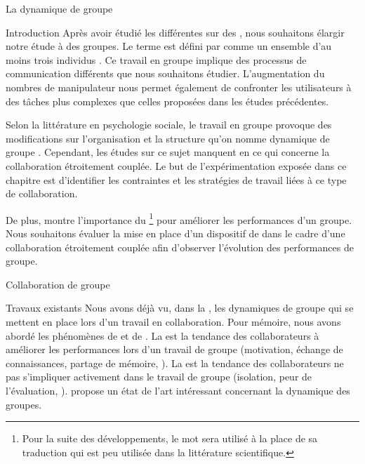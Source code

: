\documentclass[myfrancais,ngerman,english,french]{mythesis}
\begin{document}
	\begin{mychapter}{La dynamique de groupe}
		\begin{mysection}{Introduction}
			Après avoir étudié les différentes  sur des , nous souhaitons élargir notre étude à des groupes.
			Le terme  est défini par  comme un \og ensemble d'au moins trois individus \fg.
			Ce travail en groupe implique des processus de communication différents que nous souhaitons étudier.
			L'augmentation du nombres de manipulateur nous permet également de confronter les utilisateurs à des tâches plus complexes que celles proposées dans les études précédentes.

			Selon la littérature en psychologie sociale, le travail en groupe provoque des modifications sur l'organisation et la structure  qu'on nomme \og dynamique de groupe \fg.
			Cependant, les études sur ce sujet manquent en ce qui concerne la collaboration étroitement couplée.
			Le but de l'expérimentation exposée dans ce chapitre est d'identifier les contraintes et les stratégies de travail liées à ce type de collaboration.

			De plus,  montre l'importance du \mybrainstorming\footnote{Pour la suite des développements, le mot \mybrainstorming sera utilisé à la place de sa traduction  qui est peu utilisée dans la littérature scientifique.} pour améliorer les performances d'un groupe.
			Nous souhaitons évaluer la mise en place d'un dispositif de \mybrainstorming dans le cadre d'une collaboration étroitement couplée afin d'observer l'évolution des performances de groupe.
		\end{mysection}
		\begin{mysection}{Collaboration de groupe}
			\begin{mysubsection}{Travaux existants}
				Nous avons déjà vu, dans la , les dynamiques de groupe qui se mettent en place lors d'un travail en collaboration.
				Pour mémoire, nous avons abordé les phénomènes de   et de  .
				La  est la tendance des collaborateurs à améliorer les performances lors d'un travail de groupe (motivation, échange de connaissances, partage de mémoire, \myetc).
				La  est la tendance des collaborateurs ne pas s'impliquer activement dans le travail de groupe (isolation, peur de l'évaluation, \myetc).
				 propose un état de l'art intéressant concernant la dynamique des groupes.


\end{mysubsection}
\end{mysection}
\end{mychapter}
\end{document}
